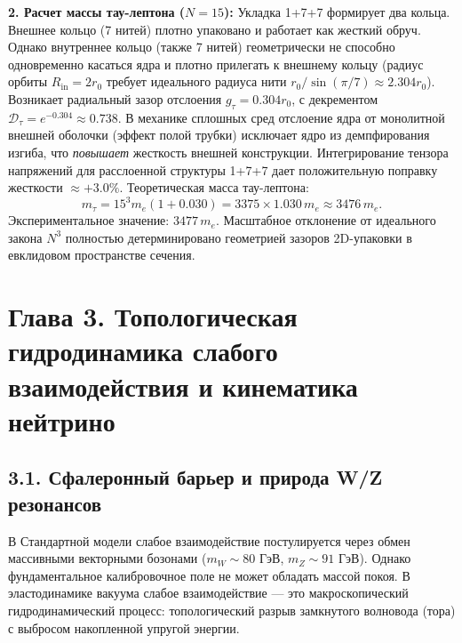 \documentclass[12pt,a4paper]{article}
\begin{document}
	\textbf{2. Расчет массы тау-лептона ($N=15$):}
	Укладка 1+7+7 формирует два кольца. Внешнее кольцо (7 нитей) плотно упаковано и работает как жесткий обруч. Однако внутреннее кольцо (также 7 нитей) геометрически не способно одновременно касаться ядра и плотно прилегать к внешнему кольцу (радиус орбиты $R_{\text{in}} = 2r_0$ требует идеального радиуса нити $r_0 / \sin(\pi/7) \approx 2.304 r_0$). Возникает радиальный зазор отслоения $g_\tau = 0.304 r_0$, с декрементом $\mathcal{D}_\tau = e^{-0.304} \approx 0.738$.
	В механике сплошных сред отслоение ядра от монолитной внешней оболочки (эффект полой трубки) исключает ядро из демпфирования изгиба, что \textit{повышает} жесткость внешней конструкции. Интегрирование тензора напряжений для расслоенной структуры 1+7+7 дает положительную поправку жесткости $\approx +3.0\%$.
	Теоретическая масса тау-лептона:
	\begin{equation}
		m_\tau = 15^3 m_e (1 + 0.030) = 3375 \times 1.030 \, m_e \approx 3476 \, m_e.
	\end{equation}
	Экспериментальное значение: $3477 \, m_e$. 
	Масштабное отклонение от идеального закона $N^3$ полностью детерминировано геометрией зазоров 2D-упаковки в евклидовом пространстве сечения.
	
	
	\section{Глава 3. Топологическая гидродинамика слабого взаимодействия и кинематика нейтрино}
	
	\subsection{3.1. Сфалеронный барьер и природа W/Z резонансов}
	В Стандартной модели слабое взаимодействие постулируется через обмен массивными векторными бозонами ($m_W \sim 80$ ГэВ, $m_Z \sim 91$ ГэВ). Однако фундаментальное калибровочное поле не может обладать массой покоя. В эластодинамике вакуума слабое взаимодействие — это макроскопический гидродинамический процесс: топологический разрыв замкнутого волновода (тора) с выбросом накопленной упругой энергии.
	
\end{document}
